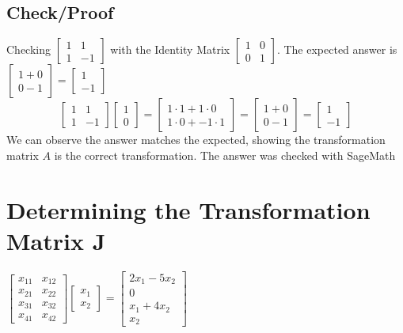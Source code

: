\documentclass{article}
\begin{document}
\subsection{Check/Proof}
Checking $\begin{bmatrix}1&1\\1&-1\end{bmatrix}$ with the Identity Matrix $\begin{bmatrix}1&0\\0&1\end{bmatrix}$. 
The expected answer is $\begin{bmatrix}1+0\\0-1\end{bmatrix} = \begin{bmatrix}1\\-1\end{bmatrix}$
\\[0.2in]$$\begin{bmatrix}1&1\\1&-1\end{bmatrix}\begin{bmatrix}1\\0\end{bmatrix}= \begin{bmatrix}
1\cdot 1 + 1 \cdot 0 \\ 1\cdot 0+-1\cdot 1\end{bmatrix}=\begin{bmatrix}1+0\\0-1\end{bmatrix}=\begin{bmatrix}1\\-1\end{bmatrix}$$
We can observe the answer matches the expected, showing the transformation matrix $A$ is the correct transformation. The answer was checked with SageMath
\section{Determining the Transformation Matrix J}
$\begin{bmatrix}
x_{11}&x_{12}\\x_{21}&x_{22}\\x_{31}&x_{32}\\x_{41}&x_{42}
\end{bmatrix}\begin{bmatrix}x_1\\x_2\end{bmatrix}=\begin{bmatrix}
    2x_1 - 5x_2\\0\\x_1+4x_2\\x_2
\end{bmatrix}$
\end{document}
